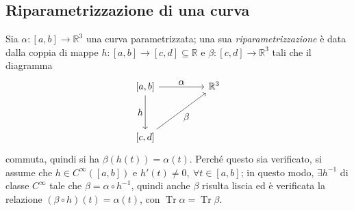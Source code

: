 \documentclass[12pt]{scrartcl}
\theoremstyle{style}
\numberwithin{equation}{subsection}
\begin{document}
\subsection{Riparametrizzazione di una curva}
Sia $\alpha : [a,b]\to\mathbb{R}^3$ una curva parametrizzata; una sua \textit{riparametrizzazione} \`e data dalla coppia di mappe $h:[a,b]\to [c,d] \subseteq \mathbb{R}$ e $\beta : [c,d]\to \mathbb{R}^3$ tali che il diagramma
\[
\begin{tikzcd}
	\left[ a,b \right]  & & \mathbb{R}^3\\
	\\
	\left[ c,d \right] 
	\arrow[from=1-1, to=1-3, "\displaystyle \alpha "]
	\arrow[from=1-1,to=3-1,"\displaystyle h"']
	\arrow[from=3-1,to=1-3,"\displaystyle \beta"']
\end{tikzcd}
\] 
commuta, quindi si ha $\beta (h(t)) = \alpha (t)$. 
Perch\'e questo sia verificato, si assume che $h \in C^\infty([a,b])$ e $h'(t) \neq 0, \ \forall t \in [a,b]$; in questo modo, $\exists h^{-1}$ di classe $C^\infty$ tale che $\beta = \alpha \circ h^{-1}$, quindi anche $\beta $ risulta liscia ed \`e verificata la relazione $(\beta \circ h)(t) = \alpha (t)$, con $\operatorname{Tr} \alpha =\operatorname{Tr} \beta $.
\end{document}
